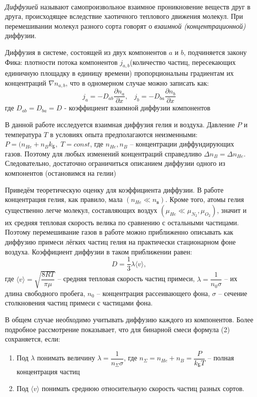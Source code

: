 \documentclass[a4paper,12pt]{article} %
\begin{document}
\paragraph{} \textit{Диффузией} называют самопроизвольное взаимное проникновение веществ друг в друга, происходящее вследствие хаотичного теплового движения молекул. При перемешивании молекул разного сорта говорят о \textit{взаимной (концентрационной)} диффузии.

Диффузия в системе, состоящей из двух компонентов $a$ и $b$, подчиняется закону Фика: плотности потока компонентов $j_{a,b}$(количество частиц, пересекающих единичную площадку в единицу времени) пропорциональны градиентам их концентраций $\nabla n_{a, b}$, что в одномерном случае можно записать как:
\begin{equation}
j_a = -D_{ab}\frac{\partial n_a}{\partial x}, 
\;\;\; j_b = -D_{ba}\frac{\partial n_b}{\partial x}
\end{equation} 
где $D_{ab} = D_{ba} = D$ - коэффициент взаимной диффузии компонентов

В данной работе исследуется взаимная диффузия гелия и воздуха. Давление $P$ и температура $T$ в условиях опыта предполагаются неизменными: $P = (n_{He}+n_{B}k_\text{Б},\; T = const$, где $n_{He}, n_{B}$ -- концентрации диффундирующих газов. Поэтому для любых изменений концентраций справедливо $\Delta n_{B} = \Delta n_{He}$. Следовательно, достаточно ограничиться описанием диффузии одного из компонентов (остановимся на гелии)

Приведём теоретическую оценку для коэффициента диффузии. В работе концентрация гелия, как правило, мала $(n_{He}\ll n_{в})$. Кроме того, атомы гелия
существенно легче молекул, составляющих воздух $(\mu_{He}\ll\mu_{N_2},\mu_{O_2})$, значит и их средняя тепловая скорость велика по сравнению с остальными частицами. Поэтому перемешивание газов в работе можно приближенно описывать как диффузию примеси лёгких частиц гелия на практически стационарном фоне воздуха. Коэффициент диффузии в таком приближении равен:
\begin{equation}
D = \frac{1}{3}\lambda\langle v \rangle,
\end{equation}
где $\langle v \rangle = \sqrt{\dfrac{8RT}{\pi\mu}}$ -- средняя тепловая скорость частиц примеси, $\lambda = \dfrac{1}{n_0\sigma}$ -- их длина свободного пробега, $n_0$ -- концентрация рассеивающего фона, $\sigma$ -- сечение столкновения частиц примеси с частицами фона.

В общем случае необходимо учитывать диффузию каждого из
компонентов. Более подробное рассмотрение показывает, что для бинарной смеси формула (2) сохраняется, если:
\begin{enumerate}
\itemsep0em
\item Под $\lambda$ понимать величину $\lambda = \dfrac{1}{n_{\Sigma}\sigma}$, где $n_{\Sigma}=n_{He}+n_{B} = \dfrac{P}{k_{\text{Б}}T}$ -- полная концентрация частиц
\item Под $\langle v \rangle$ понимать среднюю относительную скорость частиц разных сортов.

\end{enumerate}
\end{document}
